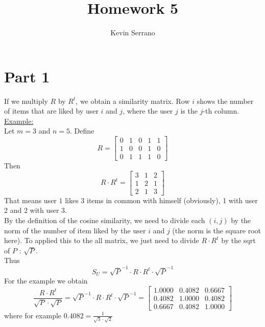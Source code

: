 \documentclass[11pt,a4paper,notitlepage]{article}
\author{Kevin Serrano}
\title{Homework 5}
\begin{document}
\maketitle
\section*{Part 1}
If we multiply $R$ by $R^t$, we obtain a similarity matrix. Row $i$ shows the number of items that are liked by user $i$ and $j$, where the user $j$ is the $j$-th column.\\
\underline{Example:}\\
Let $m = 3$ and $n = 5$. Define $$R = \left[\begin{matrix}
0 & 1 &    0  &   1 &    1 \\
     1  &   0   &  0 &     1  &   0\\
     0   &  1   &  1  &   1   &  0
\end{matrix}\right]$$ Then $$R \cdot R^t = \left[ \begin{matrix}
     3  &   1   &  2\\
     1  &   2  &   1\\
     2  &   1 &    3
\end{matrix}\right]$$
That means user $1$ likes $3$ items in common with himself (obviously), 1 with user 2 and 2 with user 3. \\

By the definition of the cosine similarity, we need to divide each $(i,j)$ by the norm of the number of item liked by the user $i$ and $j$ (the norm is the square root here). To applied this to the all matrix, we just need to divide $R\cdot R^t$ by the sqrt of $P$ : $\sqrt{P}$.\\
Thus $$S_U = \sqrt{P}^{-1} \cdot R \cdot R^t \cdot \sqrt{P}^{-1}$$
For the example we obtain $$\frac{R \cdot R^t}{\sqrt{P} \cdot \sqrt{P}} =\sqrt{P}^{-1} \cdot R\cdot R^t\cdot  \sqrt{P}^{-1}= \left[\begin{matrix}
    1.0000  &  0.4082 &   0.6667\\
    0.4082  &  1.0000 &   0.4082\\
    0.6667  &  0.4082 &   1.0000
\end{matrix}\right]$$
where for example $0.4082 = \frac{1}{\sqrt{3} \cdot \sqrt{2}}$\\
\end{document}
